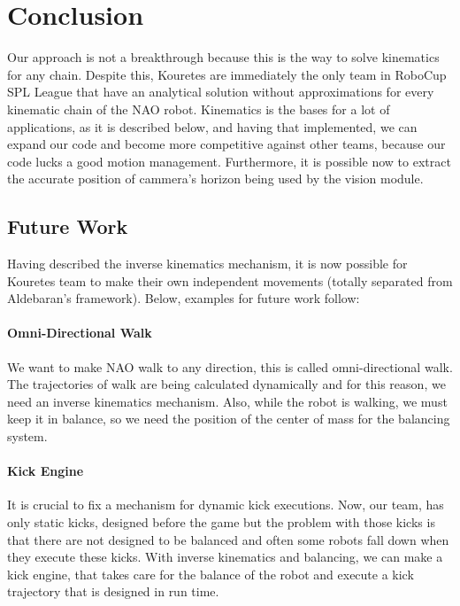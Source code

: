 \chapter{Conclusion}
\label{conclusion}
Our approach is not a breakthrough because this is the way to solve kinematics for any chain. Despite this, Kouretes are immediately the only team in RoboCup SPL League that have an analytical solution without approximations for every kinematic chain of the NAO robot. Kinematics is the bases for a lot of applications, as it is described below, and having that implemented, we can expand our code and become more competitive against other teams, because our code lucks a good motion management. Furthermore, it is possible now to extract the accurate position of cammera's horizon being used by the vision module.  
\section{Future Work}
Having described the inverse kinematics mechanism, it is now possible for Kouretes team to make their own independent movements (totally separated from Aldebaran's framework). Below, examples for future work follow:

\subsubsection*{Omni-Directional Walk}
We want to make NAO walk to any direction, this is called omni-directional walk. The trajectories of walk are being calculated dynamically and for this reason, we need an inverse kinematics mechanism. Also, while the robot is walking, we must keep it in balance, so we need the position of the center of mass for the balancing system.\\

\subsubsection*{Kick Engine}
It is crucial to fix a mechanism for dynamic kick executions. Now, our team, has only static kicks, designed before the game but the problem with those kicks is that there are not designed to be balanced and often some robots fall down when they execute these kicks. With inverse kinematics and balancing, we can make a kick engine, that takes care for the balance of the robot and execute a kick trajectory that is designed in run time.